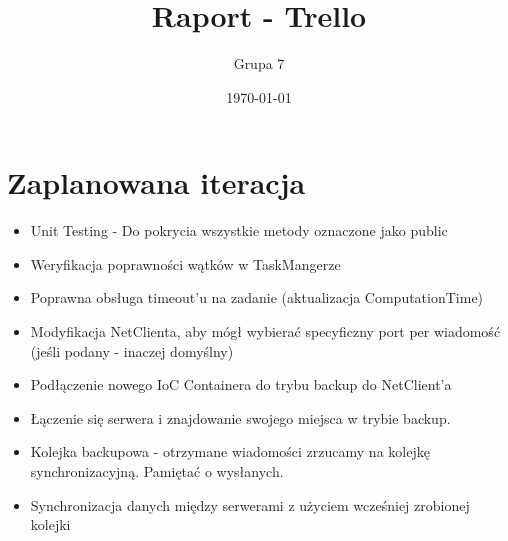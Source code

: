 \documentclass[a4paper]{article}
\title{Raport - Trello}
\date{\today}
\author{Grupa 7}
\begin{document}
\maketitle

\section {Zaplanowana iteracja}
\begin{itemize}
\item Unit Testing - Do pokrycia wszystkie metody oznaczone jako public
\item Weryfikacja poprawności wątków w TaskMangerze
\item Poprawna obsługa timeout'u na zadanie (aktualizacja ComputationTime)
\item Modyfikacja NetClienta, aby mógł wybierać specyficzny port per wiadomość (jeśli podany - inaczej domyślny)
\item Podłączenie nowego IoC Containera do trybu backup do NetClient'a
\item Łączenie się serwera i znajdowanie swojego miejsca w trybie backup.
\item Kolejka backupowa - otrzymane wiadomości zrzucamy na kolejkę synchronizacyjną. Pamiętać o wysłanych.
\item Synchronizacja danych między serwerami z użyciem wcześniej zrobionej kolejki
\end{itemize}

   
\end{document}

